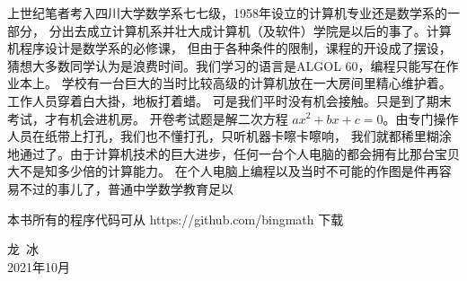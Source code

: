 \documentclass[main.tex]{subfiles}
\begin{document}
上世纪笔者考入四川大学数学系七七级，1958年设立的计算机专业还是数学系的一部分，
分出去成立计算机系并壮大成计算机（及软件）学院是以后的事了。计算机程序设计是数学系的必修课，
但由于各种条件的限制，课程的开设成了摆设，猜想大多数同学认为是浪费时间。我们学习的语言是ALGOL 60，编程只能写在作业本上。
学校有一台巨大的当时比较高级的计算机放在一大房间里精心维护着。工作人员穿着白大掛，地板打着蜡。
可是我们平时没有机会接触。只是到了期末考试，才有机会进机房。
开卷考试题是解二次方程 $ax^2+bx+c = 0$。由专门操作人员在纸带上打孔，我们也不懂打孔，只听机器卡嚓卡嚓响，
我们就都稀里糊涂地通过了。由于计算机技术的巨大进步，任何一台个人电脑的都会拥有比那台宝贝大不是知多少倍的计算能力。
在个人电脑上编程以及当时不可能的作图是件再容易不过的事儿了，普通中学数学教育足以


本书所有的程序代码可从 https://github.com/bingmath 下载
\begin{flushright}
龙\, 冰\,\,\\
2021年10月
\end{flushright}
\end{document}
